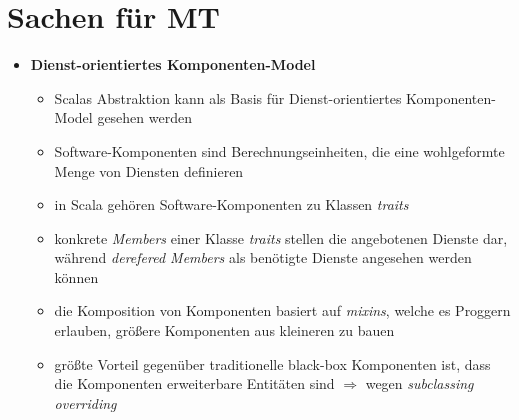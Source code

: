 \section{Sachen für MT}
\begin{itemize}
  \item \textbf{Dienst-orientiertes Komponenten-Model}
  \begin{itemize}
    \item Scalas Abstraktion kann als Basis für Dienst-orientiertes 
    Komponenten-Model gesehen werden
    \item Software-Komponenten sind Berechnungseinheiten, die eine wohlgeformte
    Menge von Diensten definieren
    \item in Scala gehören Software-Komponenten zu Klassen \und \textit{traits}
    \item konkrete \textit{Members} einer Klasse \oder \textit{traits} stellen
    die angebotenen Dienste dar, während \textit{derefered Members} als
    benötigte Dienste angesehen werden können
    \item die Komposition von Komponenten basiert auf \textit{mixins}, welche
    es Proggern erlauben, größere Komponenten aus kleineren zu bauen
    \item größte Vorteil gegenüber traditionelle black-box Komponenten ist,
    dass die Komponenten erweiterbare Entitäten sind $\Rightarrow$ wegen
    \textit{subclassing} \und \textit{overriding}
  \end{itemize}
\end{itemize}


%

